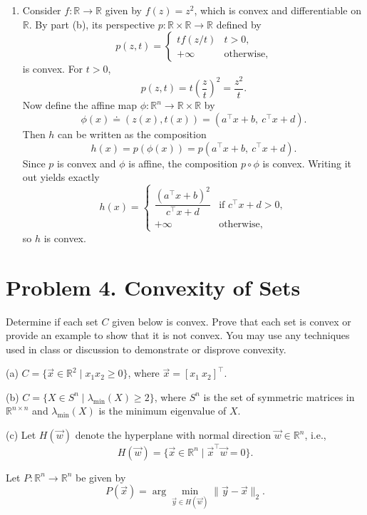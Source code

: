 \documentclass[
  12pt,
]{fphw}
\begin{document}
\begin{enumerate}
\item[(c)] Consider $f:\mathbb{R}\to\mathbb{R}$ given by $f(z)=z^2$, which is convex and differentiable on $\mathbb{R}$.
By part (b), its perspective $p:\mathbb{R}\times\mathbb{R}\to\mathbb{R}$ defined by
\[
p(z,t)=
\begin{cases}
t f(z/t) & t>0,\\
+\infty & \text{otherwise},
\end{cases}
\]
is convex. For $t>0$,
\[
p(z,t)=t\left(\frac{z}{t}\right)^2=\frac{z^2}{t}.
\]
Now define the affine map $\phi:\mathbb{R}^n\to\mathbb{R}\times\mathbb{R}$ by
\[
\phi(x) \doteq (z(x),t(x)) = (a^\top x+b,\ c^\top x+d).
\]
Then $h$ can be written as the composition
\[
h(x)=p(\phi(x))=p(a^\top x+b,\ c^\top x+d).
\]
Since $p$ is convex and $\phi$ is affine, the composition $p\circ\phi$ is convex. Writing it out yields exactly
\[
h(x)=
\begin{cases}
\dfrac{(a^\top x+b)^2}{c^\top x+d} & \text{if } c^\top x+d>0,\\[6pt]
+\infty & \text{otherwise},
\end{cases}
\]
so $h$ is convex.
\end{enumerate}

\newpage
\section*{Problem 4. Convexity of Sets}

Determine if each set $C$ given below is convex. Prove that each set is convex or provide an example to show that
it is not convex. You may use any techniques used in class or discussion to demonstrate or disprove convexity.

(a) $C = \{\vec{x} \in \mathbb{R}^2 \mid x_1 x_2 \ge 0\}$, where $\vec{x} = [x_1 \ x_2]^\top$.

(b) $C = \{X \in S^n \mid \lambda_{\min}(X) \ge 2\}$, where $S^n$ is the set of symmetric matrices in $\mathbb{R}^{n\times n}$ and $\lambda_{\min}(X)$ is the minimum eigenvalue of $X$.

(c) Let $H(\vec{w})$ denote the hyperplane with normal direction $\vec{w} \in \mathbb{R}^n$, i.e.,
\[
H(\vec{w}) = \{\vec{x} \in \mathbb{R}^n \mid \vec{x}^\top \vec{w} = 0\}. \tag{9}
\]

Let $P : \mathbb{R}^n \to \mathbb{R}^n$ be given by
\[
P(\vec{x}) = \arg\min_{\vec{y} \in H(\vec{w})} \|\vec{y} - \vec{x}\|_2. \tag{10}
\]
\end{document}
